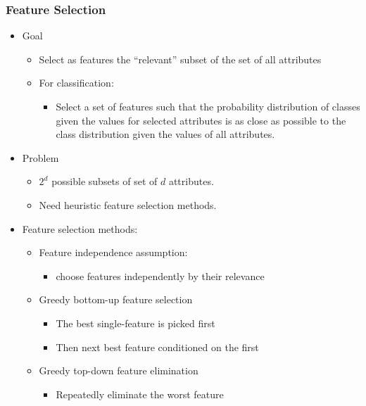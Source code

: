 \documentclass[../notes.tex]{subfiles}
\begin{document}
\subsubsection{Feature Selection}
\begin{itemize}
  \item Goal
  \begin{itemize}
    \item Select as features the ``relevant'' subset of the set of all attributes
    \item For classification:
    \begin{itemize}
      \item Select a set of features such that the probability distribution of classes given the values for selected attributes is as close as possible
to the class distribution given the values of all attributes.
    \end{itemize}
  \end{itemize}  

  \item Problem
  \begin{itemize}
    \item $2^d$ possible subsets of set of $d$ attributes. 
    \item Need heuristic feature selection methods.
  \end{itemize}

  \item Feature selection methods:
  \begin{itemize}
    \item Feature independence assumption:
    \begin{itemize}
      \item choose features independently by their relevance
    \end{itemize}

    \item Greedy bottom-up feature selection
    \begin{itemize}
      \item The best single-feature is picked first
      \item Then next best feature conditioned on the first
    \end{itemize}

    \item Greedy top-down feature elimination
    \begin{itemize}
      \item Repeatedly eliminate the worst feature
    \end{itemize}


\end{itemize}
\end{itemize}
\end{document}
